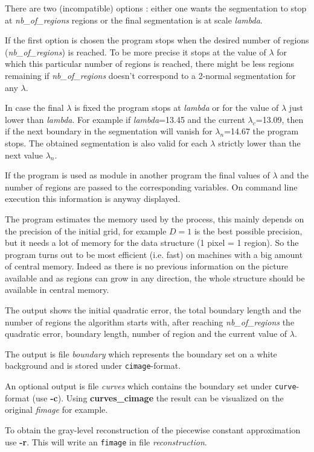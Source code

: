 There are two (incompatible) options : either one wants the segmentation
to stop at {\em nb\_of\_regions} regions or the final segmentation is
at scale {\em lambda}.

If the first option is chosen the program stops when the desired 
number of regions ({\em nb\_of\_regions})
is reached. To be more precise it stops at the value of $\lambda$ for which this
particular number of regions is reached, there might be less regions
remaining if {\em nb\_of\_regions} doesn't correspond to a 2-normal segmentation
for any $\lambda$.

In case the final $\lambda$ is fixed the program stops at {\em lambda} or
for the value of $\lambda$ just lower than {\em lambda}. For example if
{\em lambda}=13.45 and the current $\lambda_c$=13.09, then if the next
boundary in the segmentation will vanish for $\lambda_n$=14.67 the program
stops. The obtained segmentation is also valid for each $\lambda$ strictly
lower than the next value $\lambda_n$.

If the program is used as module in another program the final values
of $\lambda$ and the number of regions are passed to the corresponding
variables. On command line execution this information is anyway displayed.

The program estimates the memory used by the process, this mainly depends
on the precision of the initial grid, for example $D=1$ is the best possible
precision, but it needs a lot of memory for the data structure 
(1 pixel = 1 region). So the program turns out to be most efficient 
(i.e. fast) on machines with a big amount of central memory. Indeed as there
is no previous information on the picture available and as regions can grow
in any direction, the whole structure should be available in central memory.

The output shows the initial quadratic error, the total boundary length and
the number of regions the algorithm starts with, after reaching 
{\em nb\_of\_regions} the quadratic error, boundary length, number of region
and the current value of $\lambda$.

The output is file {\em boundary} which represents the boundary set
on a white background and is stored under {\tt cimage}-format.

An optional output is file {\em curves}
 which contains the boundary set under 
{\tt curve}-format (use {\bf -c}).
Using {\bf curves\_cimage} the result can be visualized
on the original {\em fimage} for example.

To obtain the gray-level reconstruction of
the piecewise constant approximation use {\bf -r}.
This will write an {\tt fimage}
in file {\em reconstruction}.